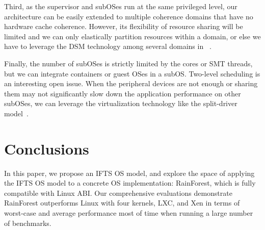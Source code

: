 \documentclass[pageno]{jpaper}
\begin{document}
Third, as the supervisor and  subOSes run at the same privileged level, our architecture can be easily extended to multiple coherence domains that have no hardware cache coherence. However, its flexibility of resource sharing will be limited and we can only elastically partition resources within a domain, or else we have to leverage the DSM technology among several domains in ~\cite{lin2014k2}.









Finally, the number of subOSes is strictly limited by the cores or SMT threads, but we can  integrate containers or guest OSes in a subOS. Two-level scheduling is  an interesting open issue.
When the peripheral devices are not enough or sharing them may not significantly slow down the application performance on other subOSes, we can leverage the virtualization technology like the split-driver model~\cite{chisnall2008definitive, liu2006high}.

















































\section{Conclusions}

In this paper, we propose an IFTS OS model, and explore the space of applying the IFTS OS model to a concrete OS implementation:  RainForest, which is  fully compatible with Linux ABI. Our comprehensive evaluations  demonstrate RainForest outperforms Linux with four kernels, LXC, and Xen in terms of worst-case and average performance most of time when running a large number of benchmarks. 























 


\end{document}
